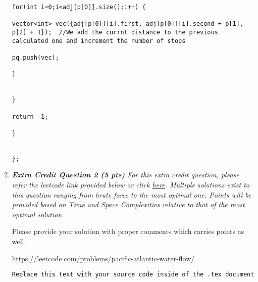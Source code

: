 \documentclass[12pt]{article}
\begin{document}
\begin{enumerate}
\begin{verbatim}
for(int i=0;i<adj[p[0]].size();i++) {

vector<int> vec({adj[p[0]][i].first, adj[p[0]][i].second + p[1], p[2] + 1});  //We add the currnt distance to the previous calculated one and increment the number of stops

pq.push(vec);

}


}

return -1;

}


};
\end{verbatim}	

\item{\itshape \textbf{Extra Credit Question 2 (5 pts)}
    For this extra credit question, please refer the leetcode link provided below or click \href{https://leetcode.com/problems/pacific-atlantic-water-flow/}{here}. Multiple solutions exist to this question ranging from brute force to the most optimal one. Points will be provided based on Time and Space Complexities relative to that of the most optimal solution.

    Please provide your solution with proper comments which carries points as well.}
    
   \url{https://leetcode.com/problems/pacific-atlantic-water-flow/}

\begin{verbatim}
Replace this text with your source code inside of the .tex document
\end{verbatim}	

\end{enumerate}
\end{document}

